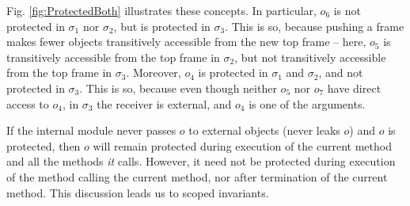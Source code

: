   Fig. \ref{fig:ProtectedBoth} illustrates these concepts. In particular, $o_6$ is not protected in $\sigma_1$ nor $\sigma_2$, but is protected in $\sigma_3$. This is so, because pushing a frame makes fewer objects  transitively accessible from the new top frame -- here, $o_5$ is transitively accessible from the  top frame in $\sigma_2$, but not transitively accessible from the   top frame in $\sigma_3$.
 Moreover, $o_4$  is  protected in $\sigma_1$ and  $\sigma_2$,  and not  protected in $\sigma_3$. 
 This is so, because even though neither $o_5$ nor $o_7$ have direct access to $o_4$, in $\sigma_3$  the receiver is external, and $o_4$ is one of the arguments.


 If the  internal module  never passes $o$ to  external objects (\ie never leaks $o$) and  $o$ is protected, then $o$ will remain protected during execution of the current method and all the methods \emph{it} calls.
However, it need not be protected during execution of the method calling the current method, nor after termination of the current method.   
This discussion leads us to  scoped invariants.



 
 

